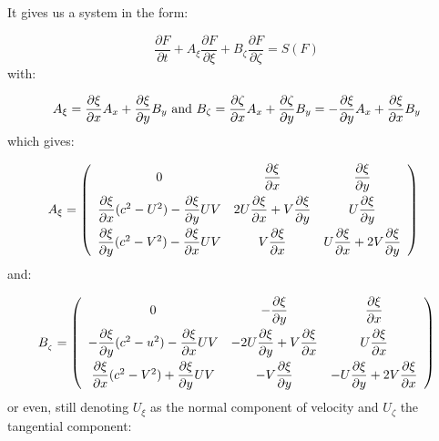It gives us a system in the form:

\begin{equation}
\dfrac{\partial F}{\partial t}+A_{\xi }\dfrac{\partial F}{\partial \xi }%
+B_{\zeta }\dfrac{\partial F}{\partial \zeta }=S(F)
\end{equation}
with:

\begin{equation*}
A_{\xi }=\dfrac{\partial \xi }{\partial x}A_{x}+\dfrac{\partial \xi }{%
\partial y}B_{y}\text{ and }B_{\zeta }=\dfrac{\partial \zeta }{\partial x}%
A_{x}+\dfrac{\partial \zeta }{\partial y}B_{y}=-\dfrac{\partial \xi }{%
\partial y}A_{x}+\dfrac{\partial \xi }{\partial x}B_{y}
\end{equation*}
which gives:

\begin{equation}
A_{\xi }=\left( 
\begin{array}{ccc}
0 & \dfrac{\partial \xi }{\partial x} & \dfrac{\partial \xi }{\partial y} \smallskip\\ 
\dfrac{\partial \xi }{\partial x}(c^{2}-U^{2})-\dfrac{\partial \xi }{%
\partial y}UV & 2U\dfrac{\partial \xi }{\partial x}+V\dfrac{\partial \xi }{%
\partial y} & U\dfrac{\partial \xi }{\partial y}\smallskip \\ 
\dfrac{\partial \xi }{\partial y}(c^{2}-V^{2})-\dfrac{\partial \xi }{%
\partial x}UV & V\dfrac{\partial \xi }{\partial x} & U\dfrac{\partial \xi }{%
\partial x}+2V\dfrac{\partial \xi }{\partial y}%
\end{array}
\right) \text{ }
\end{equation}
and:

\begin{equation}
B_{_{\zeta }}=\left( 
\begin{array}{ccc}
0 & -\dfrac{\partial \xi }{\partial y} & \dfrac{\partial \xi }{\partial x}
\smallskip\\ 
-\dfrac{\partial \xi }{\partial y}(c^{2}-u^{2})-\dfrac{\partial \xi }{%
\partial x}UV & -2U\dfrac{\partial \xi }{\partial y}+V\dfrac{\partial \xi }{%
\partial x} & U\dfrac{\partial \xi }{\partial x} \smallskip\\ 
\dfrac{\partial \xi }{\partial x}(c^{2}-V^{2})+\dfrac{\partial \xi }{%
\partial y}UV & -V\dfrac{\partial \xi }{\partial y} & -U\dfrac{\partial \xi 
}{\partial y}+2V\dfrac{\partial \xi }{\partial x}%
\end{array}
\right)
\end{equation}
or even, still denoting $U_{\xi }$ as the normal component of velocity and $%
U_{\zeta }$ the tangential component:

